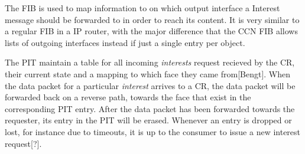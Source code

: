 The FIB is used to map information to on which output interface a Interest message should be forwarded to in order to reach its content. It is very similar to a regular FIB in a IP router, with the major difference that the CCN FIB allows lists of outgoing interfaces instead if just a single entry per object.

The PIT maintain a table for all incoming \textit{interests} request recieved by the CR, their current state and a mapping to which face they came from[Bengt]. When the data packet for a particular \textit{interest} arrives to a CR, the data packet will be forwarded back on a reverse path, towards the face that exist in the corresponding PIT entry. After the data packet has been forwarded towards the requester, its entry in the PIT will be erased. Whenever an entry is dropped or lost, for instance due to timeouts, it is up to the consumer to issue a new interest request[?].\

